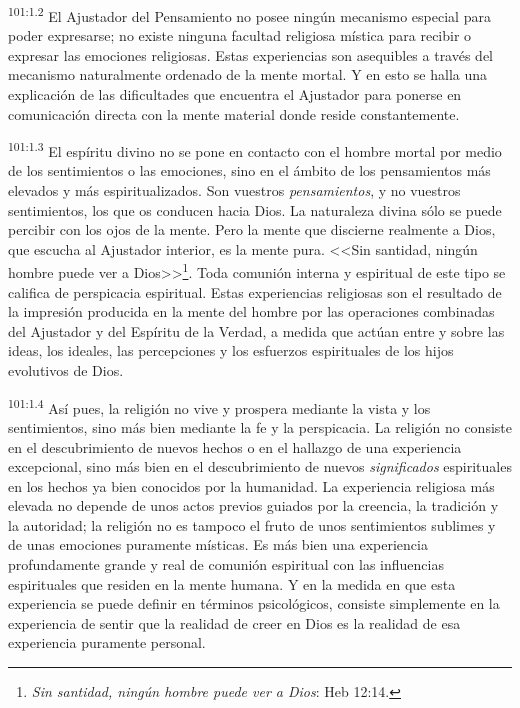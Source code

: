 \par
\textsuperscript{101:1.2} El Ajustador del Pensamiento no posee ningún mecanismo especial para poder expresarse; no existe ninguna facultad religiosa mística para recibir o expresar las emociones religiosas. Estas experiencias son asequibles a través del mecanismo naturalmente ordenado de la mente mortal. Y en esto se halla una explicación de las dificultades que encuentra el Ajustador para ponerse en comunicación directa con la mente material donde reside constantemente.

\par
\textsuperscript{101:1.3} El espíritu divino no se pone en contacto con el hombre mortal por medio de los sentimientos o las emociones, sino en el ámbito de los pensamientos más elevados y más espiritualizados. Son vuestros \textit{pensamientos}, y no vuestros sentimientos, los que os conducen hacia Dios. La naturaleza divina sólo se puede percibir con los ojos de la mente. Pero la mente que discierne realmente a Dios, que escucha al Ajustador interior, es la mente pura. <<Sin santidad, ningún hombre puede ver a Dios>>\footnote{\textit{Sin santidad, ningún hombre puede ver a Dios}: Heb 12:14.}. Toda comunión interna y espiritual de este tipo se califica de perspicacia espiritual. Estas experiencias religiosas son el resultado de la impresión producida en la mente del hombre por las operaciones combinadas del Ajustador y del Espíritu de la Verdad, a medida que actúan entre y sobre las ideas, los ideales, las percepciones y los esfuerzos espirituales de los hijos evolutivos de Dios.

\par
\textsuperscript{101:1.4} Así pues, la religión no vive y prospera mediante la vista y los sentimientos, sino más bien mediante la fe y la perspicacia. La religión no consiste en el descubrimiento de nuevos hechos o en el hallazgo de una experiencia excepcional, sino más bien en el descubrimiento de nuevos \textit{significados} espirituales en los hechos ya bien conocidos por la humanidad. La experiencia religiosa más elevada no depende de unos actos previos guiados por la creencia, la tradición y la autoridad; la religión no es tampoco el fruto de unos sentimientos sublimes y de unas emociones puramente místicas. Es más bien una experiencia profundamente grande y real de comunión espiritual con las influencias espirituales que residen en la mente humana. Y en la medida en que esta experiencia se puede definir en términos psicológicos, consiste simplemente en la experiencia de sentir que la realidad de creer en Dios es la realidad de esa experiencia puramente personal.

